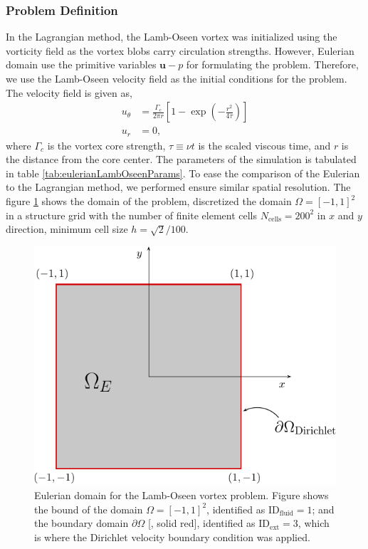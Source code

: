 \subsubsection*{Problem Definition}
In the Lagrangian method, the Lamb-Oseen vortex was initialized using the vorticity field as the vortex blobs carry circulation strengths. However, Eulerian domain use the primitive variables $\mathbf{u}-p$ for formulating the problem. Therefore, we use the Lamb-Oseen velocity field as the initial conditions for the problem. The velocity field is given as,
	\begin{subequations}
	\begin{align}
	u_{\theta} &= \frac{\Gamma_c}{2\pi r} \left[1-\exp\left(-\frac{r^2}{4\tau}\right)\right]\\
	u_r &= 0,
	\end{align}
	\end{subequations}
where $\Gamma_c$ is the vortex core strength, $\tau \equiv \nu t$ is the scaled viscous time, and $r$ is the distance from the core center. The parameters of the simulation is tabulated in table \ref{tab:eulerianLambOseenParams}. To ease the comparison of the Eulerian to the Lagrangian method, we performed ensure similar spatial resolution. The figure \ref{fig:lambOseenDomainDefinition} shows the domain of the problem, discretized the domain $\Omega = \left[-1,1\right]^2$ in a structure grid with the number of finite element cells $N_{\mathrm{cells}}=200^2$ in $x$ and $y$ direction, minimum cell size $h=\sqrt{2}/100$. 

	\begin{figure}[t]
	\centering
	\includegraphics[width=0.5\linewidth]{./figures/eulerian/lambOseenDomainDefinition-crop.pdf}
	\caption{Eulerian domain for the Lamb-Oseen vortex problem. Figure shows the bound of the domain $\Omega = \left[-1,1\right]^2$, identified as $\mathrm{ID}_{\mathrm{fluid}} = 1$; and the boundary domain $\partial \Omega$ [{\color{plotRed}{---}}, solid red], identified as  $\mathrm{ID}_{\mathrm{ext}} = 3$, which is where the Dirichlet velocity boundary condition was applied.}
	\label{fig:lambOseenDomainDefinition}
	\end{figure}

